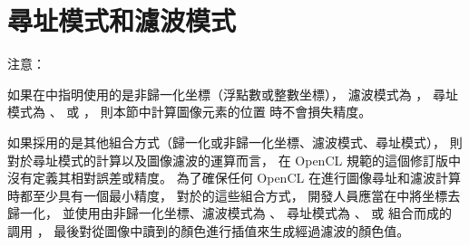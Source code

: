 \section[sec:addressFilterMode]{尋址模式和濾波模式}







注意：

如果在中指明使用的是非歸一化坐標（浮點數或整數坐標），
濾波模式為 ，
尋址模式為 、 
或 ，
則本節中計算圖像元素的位置  時不會損失精度。

如果採用的是其他組合方式（歸一化或非歸一化坐標、濾波模式、尋址模式），
則對於尋址模式的計算以及圖像濾波的運算而言，
在 OpenCL 規範的這個修訂版中沒有定義其相對誤差或精度。
為了確保任何 OpenCL 在進行圖像尋址和濾波計算時都至少具有一個最小精度，
對於的這些組合方式，
開發人員應當在中將坐標去歸一化，
並使用由非歸一化坐標、濾波模式為 、
尋址模式為 、 
或  組合而成的
調用 ，
最後對從圖像中讀到的顏色進行插值來生成經過濾波的顏色值。
